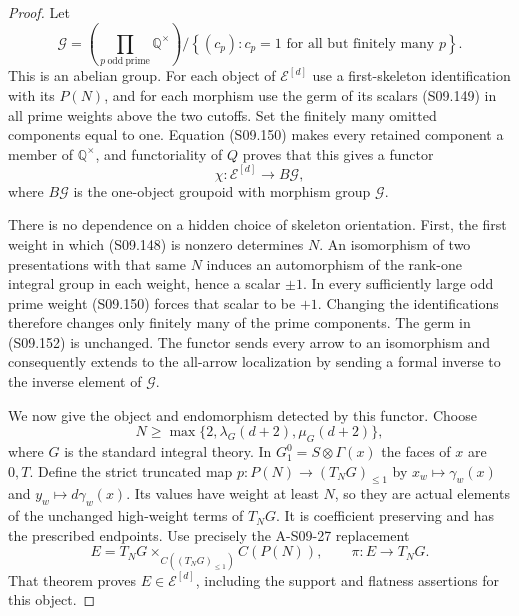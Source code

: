 \begin{proof}
Let
\[
 \mathcal G=
 \left(\prod_{p\ \mathrm{odd\ prime}}\mathbb Q^\times\right)
 \Big/
 \left\{(c_p):c_p=1\text{ for all but finitely many }p\right\}.
 \tag{S09.152}
\]
This is an abelian group. For each object of
$\mathcal E^{[d]}$ use a first-skeleton identification
with its $P(N)$, and for each morphism use the germ of
its scalars (S09.149) in all prime weights above the
two cutoffs. Set the finitely many omitted components
equal to one. Equation (S09.150) makes every retained
component a member of $\mathbb Q^\times$, and functoriality
of $Q$ proves that this gives a functor
\[
 \chi:\mathcal E^{[d]}\longrightarrow B\mathcal G,
 \tag{S09.153}
\]
where $B\mathcal G$ is the one-object groupoid with
morphism group $\mathcal G$.

There is no dependence on a hidden choice of skeleton
orientation. First, the first weight in which (S09.148)
is nonzero determines $N$. An isomorphism of two
presentations with that same $N$ induces an automorphism
of the rank-one integral group in each weight, hence a
scalar $\pm1$. In every sufficiently large odd prime
weight (S09.150) forces that scalar to be $+1$.
Changing the identifications therefore changes only
finitely many of the prime components. The germ in
(S09.152) is unchanged. The functor sends every arrow
to an isomorphism and consequently extends to the
all-arrow localization by sending a formal inverse
to the inverse element of $\mathcal G$.

We now give the object and endomorphism detected by
this functor. Choose
\[
        N\geq\max\{2,\lambda_G(d+2),\mu_G(d+2)\},
\]
where $G$ is the standard integral theory. In
$G_1^0=S\otimes\Gamma(x)$ the faces of $x$ are
$0,T$. Define the strict truncated map
$p:P(N)\to(T_NG)_{\leq1}$ by
$x_w\mapsto\gamma_w(x)$ and $y_w\mapsto d\gamma_w(x)$.
Its values have weight at least $N$, so they are actual
elements of the unchanged high-weight terms of $T_NG$.
It is coefficient preserving and has the prescribed
endpoints. Use precisely the A-S09-27 replacement
\[
 E=T_NG\mathop{\times}_{C((T_NG)_{\leq1})}C(P(N)),
                       \qquad \pi:E\longrightarrow T_NG.
\]
That theorem proves $E\in\mathcal E^{[d]}$, including
the support and flatness assertions for this object.


\end{proof}
